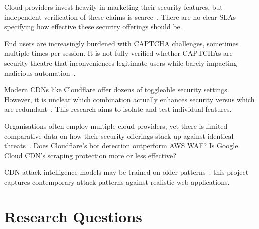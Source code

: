 \documentclass[12pt, a4paper]{report}   %
\begin{document}
\begin{description}[leftmargin=2.5cm, style=nextline]

  \item[Market-Reality Gap]
    Cloud providers invest heavily in marketing their security features, but
    independent verification of these claims is scarce~\cite{cloudflare-wp}. 
    There are no clear SLAs specifying how effective these security offerings 
    should be.

  \item[The CAPTCHA Paradox]
    End users are increasingly burdened with CAPTCHA challenges, sometimes multiple
    times per session. It is not fully verified whether CAPTCHAs are security theatre
    that inconveniences legitimate users while barely impacting malicious 
    automation~\cite{cf-captcha-end}.

  \item[Configuration Complexity]
    Modern CDNs like Cloudflare offer dozens of toggleable security settings. However,
    it is unclear which combination actually enhances security versus which are
    redundant~\cite{cf-bot-fight}. This research aims to isolate and test individual 
    features.

  \item[Multi-Cloud Comparisons]
    Organisations often employ multiple cloud providers, yet there is limited
    comparative data on how their security offerings stack up against identical
    threats~\cite{azure-frontdoor,aws-cloudfront}. Does Cloudflare's bot detection 
    outperform AWS WAF? Is Google Cloud CDN's scraping protection more or less 
    effective?

  \item[Evolution of Attack Patterns]
    CDN attack-intelligence models may be trained on older patterns~\cite{concept-drift}; 
    this project captures contemporary attack patterns against realistic web 
    applications.

\end{description}

\section{Research Questions}
\label{sec:research-questions}
\end{document}
